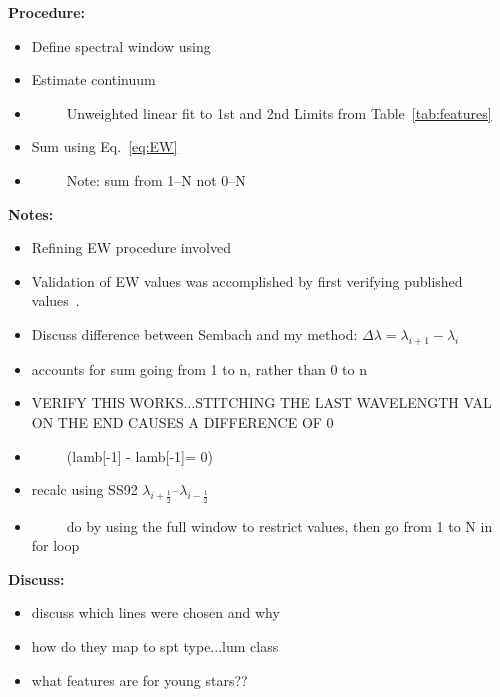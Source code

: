 {\bf Procedure:}\\
\begin{itemize}
	\item{} Define spectral window using
	\item{} Estimate continuum
	\item{}~~~~~Unweighted linear fit to 1st and 2nd Limits from Table~\ref{tab:features}
	\item{} Sum using Eq.~\ref{eq:EW}
	\item{}~~~~~Note: sum from 1--N not 0--N
\end{itemize}


{\bf Notes:}\\
\begin{itemize}
	\item{} Refining EW procedure involved
	\item{} Validation of EW values was accomplished by first verifying published values~\cite{Rayner_2009}.
	\item{} Discuss difference between Sembach and my method: $\Delta\lambda = \lambda_{i+1} - \lambda_{i}$
	\item{} accounts for sum going from 1 to n, rather than 0 to n
	\item{} VERIFY THIS WORKS...STITCHING THE LAST WAVELENGTH VAL ON THE END CAUSES A DIFFERENCE OF 0
	\item{}~~~~~(lamb[-1] - lamb[-1]= 0)
	\item{} recalc using SS92 $\lambda_{i+\frac{1}{2}}$--$\lambda_{i-\frac{1}{2}}$
	\item{}~~~~~do by using the full window to restrict values, then go from 1 to N in for loop
\end{itemize}




{\bf Discuss:}\\
\begin{itemize}
	\item{} discuss which lines were chosen and why
	\item{} how do they map to spt type...lum class
	\item{} what features are for young stars??
\end{itemize}


